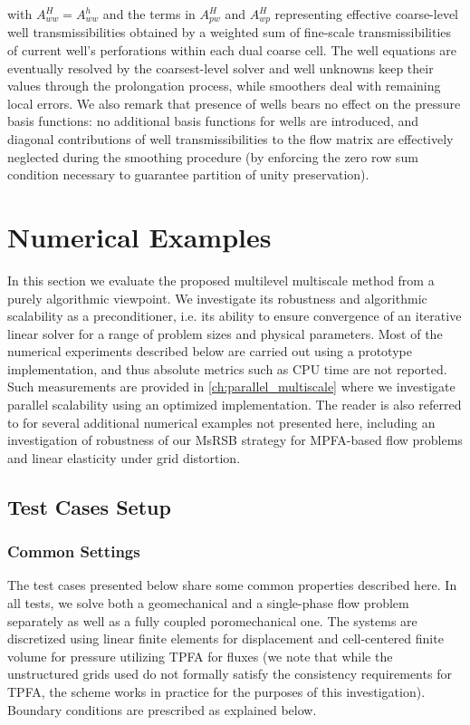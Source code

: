 with $A_{ww}^H = A_{ww}^h$ and the terms in $A_{pw}^H$ and $A_{wp}^H$ representing effective coarse-level well transmissibilities obtained by a weighted sum of fine-scale transmissibilities of current well's perforations within each dual coarse cell.   The well equations are eventually resolved by the coarsest-level solver and well unknowns keep their values through the prolongation process, while smoothers deal with remaining local errors.   We also remark that presence of wells bears no effect on the pressure basis functions: no additional basis functions for wells are introduced, and diagonal contributions of well transmissibilities to the flow matrix are effectively neglected during the smoothing procedure (by enforcing the zero row sum condition necessary to guarantee partition of unity preservation).

\section{Numerical Examples}
\label{sec:msrsb_examples}

In this section we evaluate the proposed multilevel multiscale method from a purely algorithmic viewpoint.   We investigate its robustness and algorithmic scalability as a preconditioner, i.e. its ability to ensure convergence of an iterative linear solver for a range of problem sizes and physical parameters.   Most of the numerical experiments described below are carried out using a prototype implementation, and thus absolute metrics such as CPU time are not reported.   Such measurements are provided in \cref{ch:parallel_multiscale} where we investigate parallel scalability using an optimized implementation.   The reader is also referred to \cite{Bosma2021} for several additional numerical examples not presented here, including an investigation of robustness of our MsRSB strategy for MPFA-based flow problems and linear elasticity under grid distortion.

\subsection{Test Cases Setup}
\label{subsec:msrsb_examples_setup}

\subsubsection{Common Settings}

The test cases presented below share some common properties described here.   In all tests, we solve both a geomechanical and a single-phase flow problem separately as well as a fully coupled poromechanical one.   The systems are discretized using linear finite elements for displacement and cell-centered finite volume for pressure utilizing TPFA for fluxes (we note that while the unstructured grids used do not formally satisfy the consistency requirements for TPFA, the scheme works in practice for the purposes of this investigation).   Boundary conditions are prescribed as explained below.

